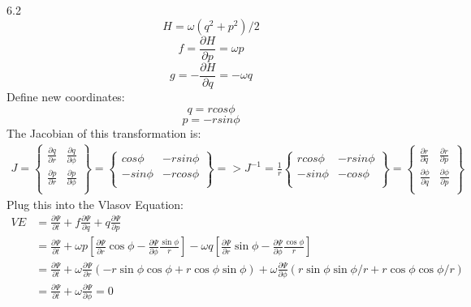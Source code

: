 \documentclass{article}
\begin{document}
	6.2
	$$ H = \omega(q^2+p^2)/2$$
	$$ f = \frac{\partial{H}}{\partial{p}} = \omega p$$
	$$ g = -\frac{\partial{H}}{\partial{q}} = -\omega q$$
	Define new coordinates:
	$$ q = r cos\phi$$
	$$ p = -rsin\phi$$
	The Jacobian of this transformation is:
	\begin{multline*}
		J =\begin{Bmatrix}
			\frac{\partial{q}}{\partial{r}}&\frac{\partial{q}}{\partial{\phi}}\\
			\frac{\partial{p}}{\partial{r}}&\frac{\partial{p}}{\partial{\phi}}\\
			\end{Bmatrix} 
			= \begin{Bmatrix}
			cos\phi & -rsin\phi\\
			-sin\phi & -rcos\phi\\
			\end{Bmatrix} 
			=>
			J^{-1} = \frac{1}{r}\begin{Bmatrix}
			rcos\phi & -rsin\phi\\
			-sin\phi & -cos\phi\\
			\end{Bmatrix} 
			= \begin{Bmatrix}
			\frac{\partial{r}}{\partial{q}}&\frac{\partial{r}}{\partial{p}}\\
			\frac{\partial{\phi}}{\partial{q}}&\frac{\partial{\phi}}{\partial{p}}\\
			\end{Bmatrix} 
	\end{multline*}
	Plug this into the Vlasov Equation:
	\begin{equation*}
		\begin{split}
		VE &= \frac{\partial{\Psi}}{\partial{t}}+f\frac{\partial{\Psi}}{\partial{q}}+q\frac{\partial{\Psi}}{\partial{p}}\\
		&= \frac{\partial{\Psi}}{\partial{t}}
		+\omega p\left[\frac{\partial{\Psi}}{\partial{r}}\cos{\phi}-\frac{\partial{\Psi}}{\partial{\phi}}\frac{\sin{\phi}}{r}\right]
		-\omega q \left[\frac{\partial{\Psi}}{\partial{r}}\sin{\phi}-\frac{\partial{\Psi}}{\partial{\phi}}\frac{\cos{\phi}}{r}\right]\\
		&= \frac{\partial{\Psi}}{\partial{t}}+
		\omega\frac{\partial{\Psi}}{\partial{r}}\left(-r\sin{\phi}\cos{\phi}+r\cos{\phi}\sin{\phi}\right)
		+\omega\frac{\partial{\Psi}}{\partial{\phi}}\left(r\sin{\phi}\sin{\phi}/r+r\cos{\phi}\cos{\phi}/r\right) \\
		&= \frac{\partial{\Psi}}{\partial{t}}+\omega\frac{\partial{\Psi}}{\partial{\phi}}=0 
		\end{split}
	\end{equation*}
\end{document}
